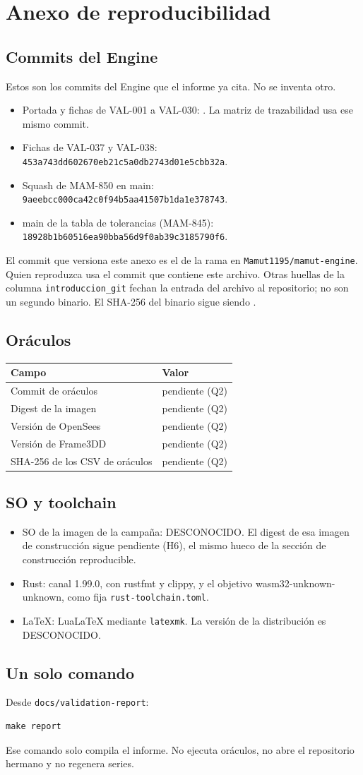 \chapter{Anexo de reproducibilidad}\label{sec:repro}
\section{Commits del Engine}
Estos son los commits del Engine que el informe ya cita. No se inventa otro.
\begin{itemize}
\item Portada y fichas de VAL-001 a VAL-030: \texttt{\EngineCommit}. La matriz de trazabilidad usa ese mismo commit.
\item Fichas de VAL-037 y VAL-038: \texttt{453a743dd602670eb21c5a0db2743d01e5cbb32a}.
\item Squash de MAM-850 en main: \texttt{9aeebcc000ca42c0f94b5aa41507b1da1e378743}.
\item main de la tabla de tolerancias (MAM-845): \texttt{18928b1b60516ea90bba56d9f0ab39c3185790f6}.
\end{itemize}
El commit que versiona este anexo es el de la rama en \texttt{Mamut1195/mamut-engine}. Quien reproduzca usa el commit que contiene este archivo. Otras huellas de la columna \texttt{introduccion\_git} fechan la entrada del archivo al repositorio; no son un segundo binario. El SHA-256 del binario sigue siendo \texttt{\EngineBinSHA}.

\section{Oráculos}
\begin{tabular}{ll}\toprule
Campo & Valor\\\midrule
Commit de oráculos & pendiente (Q2)\\
Digest de la imagen & pendiente (Q2)\\
Versión de OpenSees & pendiente (Q2)\\
Versión de Frame3DD & pendiente (Q2)\\
SHA-256 de los CSV de oráculos & pendiente (Q2)\\\bottomrule
\end{tabular}

\section{SO y toolchain}
\begin{itemize}
\item SO de la imagen de la campaña: DESCONOCIDO. El digest de esa imagen de construcción sigue pendiente (H6), el mismo hueco de la sección de construcción reproducible.
\item Rust: canal 1.99.0, con rustfmt y clippy, y el objetivo wasm32-unknown-unknown, como fija \texttt{rust-toolchain.toml}.
\item LaTeX: LuaLaTeX mediante \texttt{latexmk}. La versión de la distribución es DESCONOCIDO.
\end{itemize}

\section{Un solo comando}
Desde \texttt{docs/validation-report}:
\begin{verbatim}
make report
\end{verbatim}
Ese comando solo compila el informe. No ejecuta oráculos, no abre el repositorio hermano y no regenera series.
